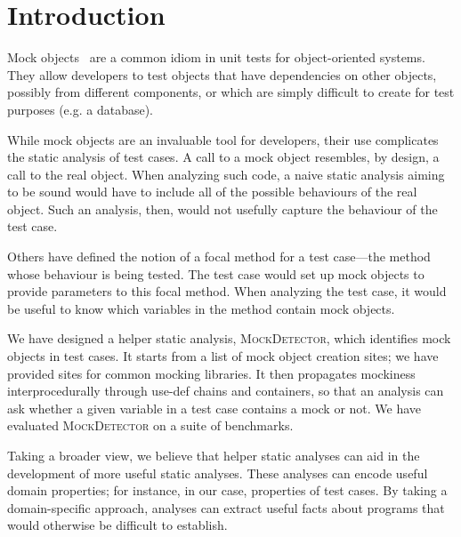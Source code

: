 \section{Introduction}
\label{sec:introduction}

Mock objects~\cite{beck02:_test_driven_devel} are a common idiom in
unit tests for object-oriented systems.  They allow developers to test
objects that have dependencies on other objects, possibly from
different components, or which are simply difficult to create for test
purposes (e.g. a database).

While mock objects are an invaluable tool for developers, their use
complicates the static analysis of test cases. A call to a mock object
resembles, by design, a call to the real object. When analyzing such
code, a naive static analysis aiming to be sound would have to include
all of the possible behaviours of the real object. Such an analysis,
then, would not usefully capture the behaviour of the test case.


Others have defined the notion of a focal method for a test case---the method
whose behaviour is being tested. %
The test case would set up mock objects to provide parameters to this focal method.
When analyzing the test case, it would be useful to know which variables in the
method contain mock objects.

We have designed a helper static analysis, \textsc{MockDetector}, which identifies
mock objects in test cases. It starts from a list of mock object creation sites; we
have provided sites for common mocking libraries. It then propagates mockiness
interprocedurally through use-def chains and containers, so that an analysis
can ask whether a given variable in a test case contains a mock or not. We have
evaluated \textsc{MockDetector} on a suite of benchmarks. %

Taking a broader view, we believe that helper static analyses can aid
in the development of more useful static analyses. These analyses can
encode useful domain properties; for instance, in our case, properties
of test cases. By taking a domain-specific approach, analyses can extract
useful facts about programs that would otherwise be difficult to establish.